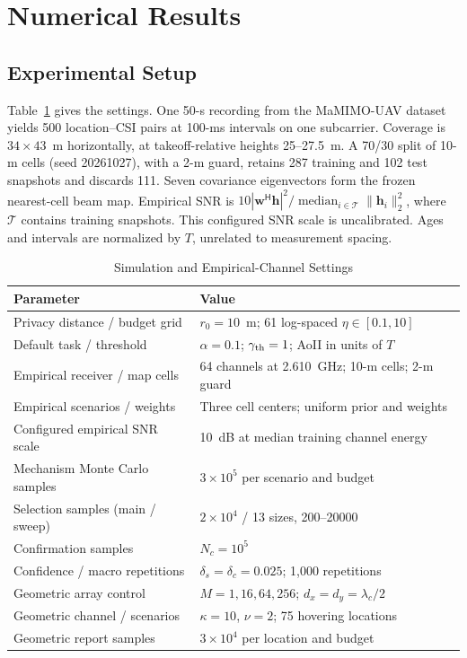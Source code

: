 \section{Numerical Results}
\label{sec:results}
\subsection{Experimental Setup}
Table~\ref{tab:parameters} gives the settings. One 50-s recording from the MaMIMO-UAV dataset~\cite{colpaert2023dataset} yields 500 location--CSI pairs at 100-ms intervals on one subcarrier. Coverage is $34\times43$~m horizontally, at takeoff-relative heights 25--27.5~m. A 70/30 split of 10-m cells (seed 20261027), with a 2-m guard, retains 287 training and 102 test snapshots and discards 111. Seven covariance eigenvectors form the frozen nearest-cell beam map. Empirical SNR is $10|\mathbf w^{\mathsf H}\mathbf h|^2/\operatorname{median}_{i\in\mathcal T}\|\mathbf h_i\|_2^2$, where $\mathcal T$ contains training snapshots. This configured SNR scale is uncalibrated. Ages and intervals are normalized by $T$, unrelated to measurement spacing.

\begin{table}[t]
\caption{Simulation and Empirical-Channel Settings}
\label{tab:parameters}
\centering
\footnotesize
\setlength{\tabcolsep}{3pt}
\begin{tabular}{p{}p{}}
\hline
Parameter & Value \\
\hline
Privacy distance / budget grid & $r_0=10$~m; 61 log-spaced $\eta\in[0.1,10]$ \\
Default task / threshold & $\alpha=0.1$; $\gamma_{\rm th}=1$; AoII in units of $T$ \\
Empirical receiver / map cells & 64 channels at 2.610~GHz; 10-m cells; 2-m guard \\
Empirical scenarios / weights & Three cell centers; uniform prior and weights \\
Configured empirical SNR scale & 10~dB at median training channel energy \\
Mechanism Monte Carlo samples & $3\times10^5$ per scenario and budget \\
Selection samples (main / sweep) & $2\times10^4$ / 13 sizes, 200--20000 \\
Confirmation samples & $N_c=10^5$ \\
Confidence / macro repetitions & $\delta_s=\delta_c=0.025$; 1,000 repetitions \\
Geometric array control & $M=1,16,64,256$; $d_x=d_y=\lambda_c/2$ \\
Geometric channel / scenarios & $\kappa=10$, $\nu=2$; 75 hovering locations \\
Geometric report samples & $3\times10^4$ per location and budget \\
\hline
\end{tabular}
\end{table}

